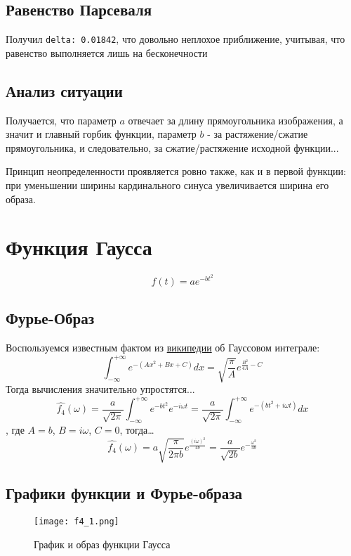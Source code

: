 \subsection{Равенство Парсеваля}

Получил \texttt{delta: 0.01842}, что довольно неплохое приближение, учитывая, что равенство выполняется лишь на бесконечности


\subsection{Анализ ситуации}
Получается, что параметр $a$ отвечает за длину прямоугольника изображения, 
а значит и главный горбик функции, параметр $b$ - за растяжение/сжатие прямоугольника, 
и следовательно, за сжатие/растяжение исходной функции...

Принцип неопределенности проявляется ровно также, как и в первой функции: 
при уменьшении ширины кардинального синуса увеличивается ширина его
образа.

\section{Функция Гаусса}
$$
f(t) = ae^{-bt^2}
$$


\subsection{Фурье-Образ}
Воспользуемся известным фактом из \href{https://ru.wikipedia.org/wiki/%D0%93%D0%B0%D1%83%D1%81%D1%81%D0%BE%D0%B2_%D0%B8%D0%BD%D1%82%D0%B5%D0%B3%D1%80%D0%B0%D0%BB?useskin=vector}{википедии} об Гауссовом интеграле:
$$
\int_{-\infty}^{+\infty}e^{-(Ax^2+Bx+C)}dx = \sqrt{\frac{\pi}{A}}e^{\frac{B^2}{4A}-C}
$$
Тогда вычисления значительно упростятся...
$$\hat{f_4}(\omega) = \frac{a}{\sqrt{2\pi}}\int_{-\infty}^{+\infty}e^{-bt^2}e^{-i\omega t} = \frac{a}{\sqrt{2\pi}}\int_{-\infty}^{+\infty}e^{-(bt^2 + i\omega t)}dx$$
, где $A=b$, $B=i\omega$, $C=0$, тогда\dots
$$
\hat{f_4}(\omega) = a\sqrt{\frac{\pi}{2\pi b}}e^{\frac{(i\omega)^2}{4b}} = \frac{a}{\sqrt{2b}}e^{-\frac{\omega^2}{4b}}
$$

\newpage
\subsection{Графики функции и Фурье-образа}

\begin{figure}[ht]
    \centering
    \texttt{[image: f4\_1.png]}
    \caption{График и образ функции Гаусса}
\end{figure}

